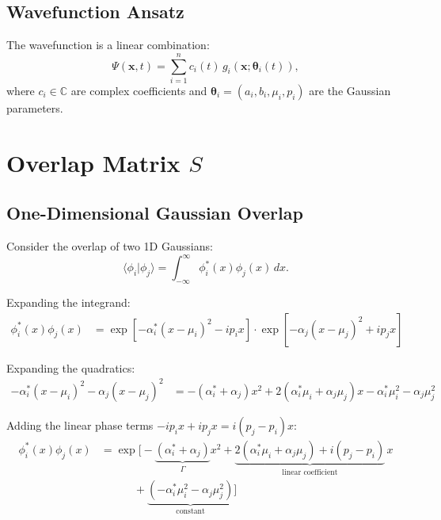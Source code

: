 \documentclass[11pt,a4paper]{article}
\newcommand{\C}{\mathbb{C}}
\theoremstyle{definition}
\begin{document}
\subsection{Wavefunction Ansatz}

The wavefunction is a linear combination:
\begin{equation}
\Psi(\bm{x}, t) = \sum_{i=1}^{n} c_i(t) \, g_i(\bm{x}; \bm{\theta}_i(t)),
\end{equation}
where $c_i \in \C$ are complex coefficients and $\bm{\theta}_i = (a_i, b_i, \mu_i, p_i)$ are the Gaussian parameters.

\section{Overlap Matrix $S$}

\subsection{One-Dimensional Gaussian Overlap}

Consider the overlap of two 1D Gaussians:
\begin{equation}
\langle \phi_i | \phi_j \rangle = \int_{-\infty}^{\infty} \phi_i^*(x) \phi_j(x) \, dx.
\end{equation}

Expanding the integrand:
\begin{align}
\phi_i^*(x) \phi_j(x) &= \exp\left[ -\alpha_i^* (x - \mu_i)^2 - i p_i x \right] \cdot \exp\left[ -\alpha_j (x - \mu_j)^2 + i p_j x \right]
\end{align}

Expanding the quadratics:
\begin{align}
-\alpha_i^*(x-\mu_i)^2 - \alpha_j(x-\mu_j)^2 &= -(\alpha_i^* + \alpha_j)x^2 + 2(\alpha_i^*\mu_i + \alpha_j\mu_j)x - \alpha_i^*\mu_i^2 - \alpha_j\mu_j^2
\end{align}

Adding the linear phase terms $-ip_i x + ip_j x = i(p_j - p_i)x$:
\begin{align}
\phi_i^*(x)\phi_j(x) &= \exp\Big[ -\underbrace{(\alpha_i^* + \alpha_j)}_{\Gamma} x^2 + \underbrace{2(\alpha_i^*\mu_i + \alpha_j\mu_j) + i(p_j - p_i)}_{\text{linear coefficient}} \, x \\
&\qquad\quad + \underbrace{(-\alpha_i^*\mu_i^2 - \alpha_j\mu_j^2)}_{\text{constant}} \Big] \nonumber
\end{align}
\end{document}
